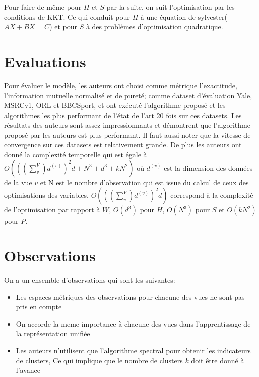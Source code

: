 \documentclass[12pt, french, latin.medieval, a4paper]{report}
\begin{document}
	Pour faire de même pour $H$ et $S$ par la suite, on suit l'optimisation par les conditions de KKT. Ce qui conduit pour $H$ à une équation de sylvester($AX+BX=C$) et pour $S$ à des problèmes d'optimisation quadratique.
    
	\section{Evaluations}
	Pour évaluer le modèle, les auteurs ont choisi comme métrique l'exactitude, l'information mutuelle normalisé et de pureté; comme dataset d'évaluation Yale, MSRCv1, ORL et BBCSport, et ont exécuté l'algorithme proposé et les algorithmes les plus performant de l'état de l'art 20 fois sur ces datasets. Les résultats des auteurs sont assez impressionnants et démontrent que l'algorithme proposé par les auteurs est plus performant. Il faut aussi noter que la vitesse de convergence sur ces datasets est relativement grande. 
	De plus les auteurs ont donné la complexité temporelle qui est égale à $O( {((\sum_v^V) d^{(v)})}^2 d + N^3 + d^3 + kN^2 )$ où $d^{(v)}$ est la dimension des données de la vue $v$ et N est le nombre d'observation qui est issue du calcul de ceux des optimisations des variables. 
	$O( {((\sum_v^V) d^{(v)})}^2 d)$ correspond à la complexité de l'optimisation par rapport à $W$, $O(d^3)$ pour $H$, $O(N^3)$ pour $S$ et $O(kN^2)$ pour $P$.
    
	\section{Observations}
	On a un ensemble d'observations qui sont les suivantes:
	\begin{itemize}
    	\item Les espaces métriques des observations pour chacune des vues ne sont pas pris en compte
    	\item On accorde la meme importance à chacune des vues dans l'apprentissage de la représentation unifiée
    	\item Les auteurs n'utilisent que l'algorithme spectral pour obtenir les indicateurs de clusters, Ce qui implique que le nombre de clusters $k$ doit être donné à l’avance
	\end{itemize}
\end{document}
